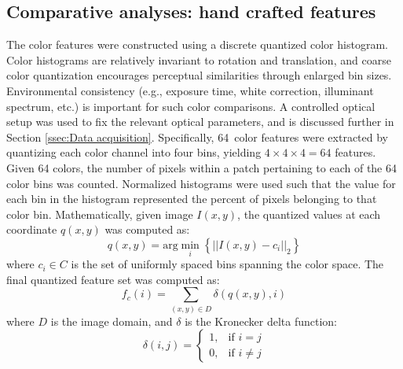 \documentclass[authoryear]{elsarticle}
\begin{document}
\subsection{Comparative analyses: hand crafted features}\label{ssec:Theory comparative lvh}
The color features were constructed using a discrete quantized color histogram. Color histograms are relatively invariant to rotation and translation, and coarse color quantization encourages perceptual similarities through enlarged bin sizes. Environmental consistency (e.g., exposure time, white correction, illuminant spectrum, etc.) is important for such color comparisons. A controlled optical setup was used to fix the relevant optical parameters, and is discussed further in Section \ref{ssec:Data acquisition}. Specifically, 64~color features were extracted by quantizing each color channel into four bins, yielding $4 \times 4 \times 4 = 64$ features. Given 64 colors, the number of pixels within a patch pertaining to each of the 64 color bins was counted. Normalized histograms were used such that the value for each bin in the histogram represented the percent of pixels belonging to that color bin. Mathematically, given image $I(x,y)$, the quantized values at each coordinate $q(x,y)$ was computed as:
\begin{equation}
q(x,y) = \text{arg}\min_i \left\{ || I(x,y) - c_i ||_2 \right\}
\end{equation}
where $c_i \in C$ is the set of uniformly spaced bins spanning the color space. The final quantized feature set was computed as:
\begin{equation}
f_c(i) = \sum_{(x,y) \in D} \delta(q(x,y),i)
\end{equation}
where $D$ is the image domain, and $\delta$ is the Kronecker delta function:
\begin{equation}
\delta(i,j) = \begin{cases}
1, & \text{if } i=j \\
0, & \text{if } i \ne j
\end{cases}
\label{eq:kronecker}
\end{equation}
\end{document}

